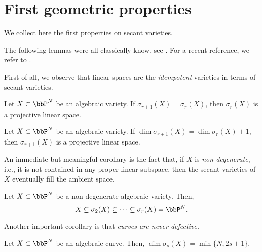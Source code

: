 \section{First geometric properties}
\label{geometrySecants-section-first_properties}

We collect here the first properties on secant varieties. 

The following lemmas were all classically know, see \cite{Pal09}. For a recent reference, we refer to \cite{Rus16}.

First of all, we observe that linear spaces are the \emph{idempotent} varieties in terms of secant varieties. 

\begin{lemma}
    \label{geometrySecants-lemma-palatini_1}
    Let $X\subset \bbP^N$ be an algebraic variety. If $\sigma_{r+1}(X) = \sigma_r(X)$, then $\sigma_r(X)$ is a projective linear space. 
\end{lemma}

\begin{lemma}
    \label{geometrySecants-lemma-palatini_2}
    Let $X\subset \bbP^N$ be an algebraic variety. If $\dim\sigma_{r+1}(X) = \dim\sigma_r(X)+1$, then $\sigma_{r+1}(X)$ is a projective linear space. 
\end{lemma}

An immediate but meaningful corollary is the fact that, if $X$ is \emph{non-degenerate}, i.e., it is not contained in any proper linear subspace, then the secant varieties of $X$ eventually fill the ambient space. 

\begin{lemma}
    \label{geometrySecants-lemma-secants_of_non_degenerate}
    Let $X\subset \bbP^N$ be a non-degenerate algebraic variety. Then, 
    \[
        X \subsetneq \sigma_2(X) \subsetneq \cdots \subsetneq \sigma_r(X) = \bbP^N.
    \]
\end{lemma}

Another important corollary is that \emph{curves are never defective.}
\begin{lemma}
    \label{geometrySecants-lemma-palatini_curves}
    Let $X\subset \bbP^N$ be an algebraic curve. Then, $\dim \sigma_s(X) = \min\{N, 2s+1\}$.
\end{lemma}






